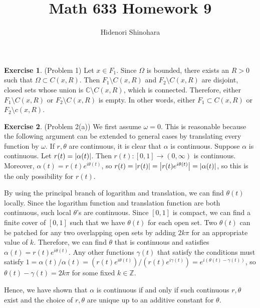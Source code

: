 \documentclass[12pt, psamsfonts]{amsart}
\theoremstyle{definition}
\newtheorem*{exer}{Exercise}
\theoremstyle{remark}
\numberwithin{equation}{section}
\begin{document}
\title{Math 633 Homework 9}
\author{Hidenori Shinohara}
\maketitle

\begin{exer}{(Problem 1)}
  Let $x \in F_1$.
  Since $\Omega$ is bounded, there exists an $R > 0$ such that $\Omega \subset C(x, R)$.
  Then $F_1 \setminus C(x, R)$ and $F_2 \setminus C(x, R)$ are disjoint, closed sets whose union is $\mathbb{C} \setminus C(x, R)$, which is connected.
  Therefore, either $F_1 \setminus C(x, R)$ or $F_2 \setminus C(x, R)$ is empty.
  In other words, either $F_1 \subset C(x, R)$ or $F_2 \setminus c(x, R)$.
\end{exer}

\begin{exer}{(Problem 2(a))}
  We first assume $\omega = 0$.
  This is reasonable because the following argument can be extended to general cases by translating every function by $\omega$.
  If $r, \theta$ are continuous, it is clear that $\alpha$ is continuous.
  Suppose $\alpha$ is continuous.
  Let $r(t) = \abs{\alpha(t)}$.
  Then $r(t):[0, 1] \rightarrow (0, \infty)$ is continuous.
  Moreover, $\alpha(t) = r(t)e^{i\theta(t)}$, so $r(t) = \abs{r(t)} = \abs{r(t)e^{i\theta(t)}} = \abs{\alpha(t)}$, so this is the only possibility for $r(t)$.

  By using the principal branch of logarithm and translation, we can find $\theta(t)$ locally.
  Since the logarithm function and translation function are both continuous, such local $\theta$'s are continuous.
  Since $[0, 1]$ is compact, we can find a finite cover of $[0, 1]$ such that we have $\theta(t)$ for each open set.
  Two $\theta(t)$ can be patched for any two overlapping open sets by adding $2k\pi$ for an appropriate value of $k$.
  Therefore, we can find $\theta$ that is continuous and satisfies $\alpha(t) = r(t)e^{i\theta(t)}$.
  Any other functions $\gamma(t)$ that satisfy the conditions must satisfy $1 = \alpha(t) / \alpha(t) = (r(t)e^{i\theta(t)}) / (r(t)e^{i\gamma(t)}) = e^{i(\theta(t) - \gamma(t))}$, so $\theta(t) - \gamma(t) = 2k\pi$ for some fixed $k \in \mathbb{Z}$.
  
  Hence, we have shown that $\alpha$ is continuous if and only if such continuous $r, \theta$ exist and the choice of $r, \theta$ are unique up to an additive constant for $\theta$.
\end{exer}
\end{document}
